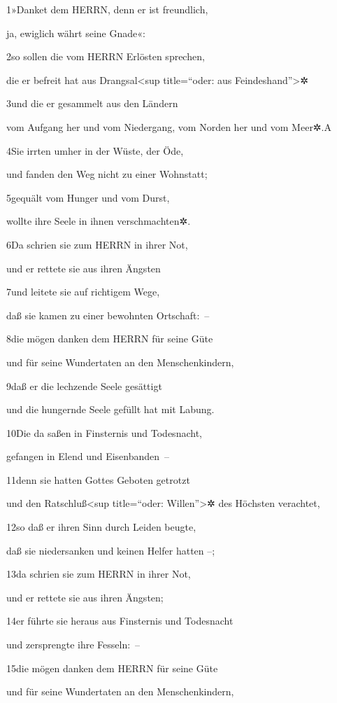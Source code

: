 1»Danket dem HERRN, denn er ist freundlich,

ja, ewiglich währt seine Gnade«:

2so sollen die vom HERRN Erlösten sprechen,

die er befreit hat aus Drangsal\textless sup title=``oder: aus
Feindeshand''\textgreater✲

3und die er gesammelt aus den Ländern

vom Aufgang her und vom Niedergang, vom Norden her und vom Meer✲.{A}

4Sie irrten umher in der Wüste, der Öde,

und fanden den Weg nicht zu einer Wohnstatt;

5gequält vom Hunger und vom Durst,

wollte ihre Seele in ihnen verschmachten✲.

6Da schrien sie zum HERRN in ihrer Not,

und er rettete sie aus ihren Ängsten

7und leitete sie auf richtigem Wege,

daß sie kamen zu einer bewohnten Ortschaft:~--

8die mögen danken dem HERRN für seine Güte

und für seine Wundertaten an den Menschenkindern,

9daß er die lechzende Seele gesättigt

und die hungernde Seele gefüllt hat mit Labung.

10Die da saßen in Finsternis und Todesnacht,

gefangen in Elend und Eisenbanden~--

11denn sie hatten Gottes Geboten getrotzt

und den Ratschluß\textless sup title=``oder: Willen''\textgreater✲ des
Höchsten verachtet,

12so daß er ihren Sinn durch Leiden beugte,

daß sie niedersanken und keinen Helfer hatten --;

13da schrien sie zum HERRN in ihrer Not,

und er rettete sie aus ihren Ängsten;

14er führte sie heraus aus Finsternis und Todesnacht

und zersprengte ihre Fesseln:~--

15die mögen danken dem HERRN für seine Güte

und für seine Wundertaten an den Menschenkindern,

